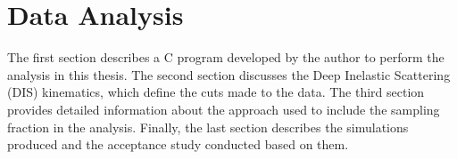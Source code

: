 \section{Data Analysis}
\label{13::data_analysis}
    The first section describes a C program developed by the author to perform the analysis in this thesis.
    The second section discusses the Deep Inelastic Scattering (DIS) kinematics, which define the cuts made to the data.
    The third section provides detailed information about the approach used to include the sampling fraction in the analysis.
    Finally, the last section describes the simulations produced and the acceptance study conducted based on them.

    
    
    
    
